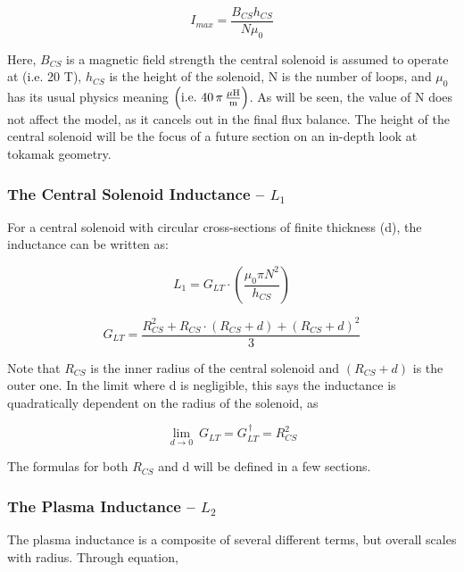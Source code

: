 \begin{equation}
	I_{max} = \frac{B_{CS} h_{CS}}{N \mu_0}
\end{equation}

Here, $B_{CS}$ is a magnetic field strength the central solenoid is assumed to operate at (i.e. 20 T), $h_{CS}$ is the height of the solenoid, N is the number of loops, and $\mu_0$ has its usual physics meaning $\left( \textnormal{i.e.} \ 40 \, \pi \, \frac{ \mu \textnormal{H}}{\textnormal{m}} \right)$. As will be seen, the value of N does not affect the model, as it cancels out in the final flux balance. The height of the central solenoid will be the focus of a future section on an in-depth look at tokamak geometry.

\subsubsection{The Central Solenoid Inductance -- $L_1$}

For a central solenoid with circular cross-sections of finite thickness (d), the inductance can be written as:

\begin{equation}
	L_1 = G_{LT} \cdot \left( \frac{\mu_0 \pi N^2}{h_{CS}} \right)
\end{equation}

\begin{equation}
	G_{LT} = \frac{R_{CS}^2 + R_{CS} \cdot ( R_{CS} + d ) + ( R_{CS} + d ) ^ 2 }{3}
\end{equation}

Note that $R_{CS}$ is the inner radius of the central solenoid and $( R_{CS} + d )$ is the outer one. In the limit where d is negligible, this says the inductance is quadratically dependent on the radius of the solenoid, as

\begin{equation}
	\label{eq:glt_simple}
	\underset{d \to 0}{\lim} \ G_{LT} = G_{LT}^{\,\dagger} = R_{CS}^2
\end{equation}

The formulas for both $R_{CS}$ and d will be defined in a few sections.

\subsubsection{The Plasma Inductance -- $L_2$}

The plasma inductance is a composite of several different terms, but overall scales with radius. Through equation,

